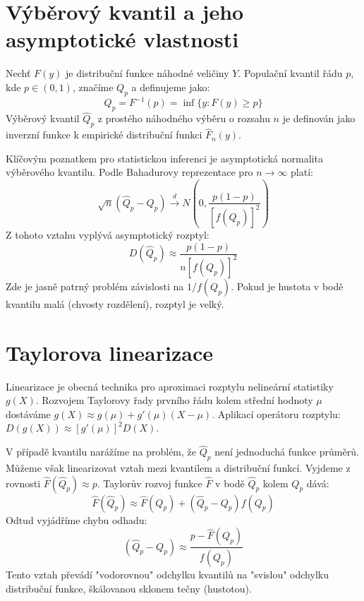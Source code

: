 \section{Výběrový kvantil a jeho asymptotické vlastnosti}

Nechť $F(y)$ je distribuční funkce náhodné veličiny $Y$. Populační kvantil řádu $p$, kde $p \in (0, 1)$, značíme $Q_p$ a definujeme jako:
\begin{equation}
Q_p = F^{-1}(p) = \inf \{ y : F(y) \ge p \}
\end{equation}
Výběrový kvantil $\hat{Q}_p$ z prostého náhodného výběru o rozsahu $n$ je definován jako inverzní funkce k empirické distribuční funkci $\hat{F}_n(y)$.

Klíčovým poznatkem pro statistickou inferenci je asymptotická normalita výběrového kvantilu. Podle Bahadurovy reprezentace pro $n \to \infty$ platí:
\begin{equation}
\sqrt{n}(\hat{Q}_p - Q_p) \xrightarrow{d} N\left( 0, \frac{p(1-p)}{[f(Q_p)]^2} \right)
\end{equation}
Z tohoto vztahu vyplývá asymptotický rozptyl:
\begin{equation}
D(\hat{Q}_p) \approx \frac{p(1-p)}{n [f(Q_p)]^2}
\end{equation}
Zde je jasně patrný problém závislosti na $1/f(Q_p)$. Pokud je hustota v bodě kvantilu malá (chvosty rozdělení), rozptyl je velký.

\section{Taylorova linearizace}

Linearizace je obecná technika pro aproximaci rozptylu nelineární statistiky $g(X)$. Rozvojem Taylorovy řady prvního řádu kolem střední hodnoty $\mu$ dostáváme $g(X) \approx g(\mu) + g'(\mu)(X-\mu)$. Aplikací operátoru rozptylu: $D(g(X)) \approx [g'(\mu)]^2 D(X)$.

V případě kvantilu narážíme na problém, že $\hat{Q}_p$ není jednoduchá funkce průměrů. Můžeme však linearizovat vztah mezi kvantilem a distribuční funkcí. Vyjdeme z rovnosti $\hat{F}(\hat{Q}_p) \approx p$. Taylorův rozvoj funkce $\hat{F}$ v bodě $\hat{Q}_p$ kolem $Q_p$ dává:
\begin{equation}
\hat{F}(\hat{Q}_p) \approx \hat{F}(Q_p) + (\hat{Q}_p - Q_p) f(Q_p)
\end{equation}
Odtud vyjádříme chybu odhadu:
\begin{equation}
(\hat{Q}_p - Q_p) \approx \frac{p - \hat{F}(Q_p)}{f(Q_p)}
\end{equation}
Tento vztah převádí "vodorovnou" odchylku kvantilů na "svislou" odchylku distribuční funkce, škálovanou sklonem tečny (hustotou).

